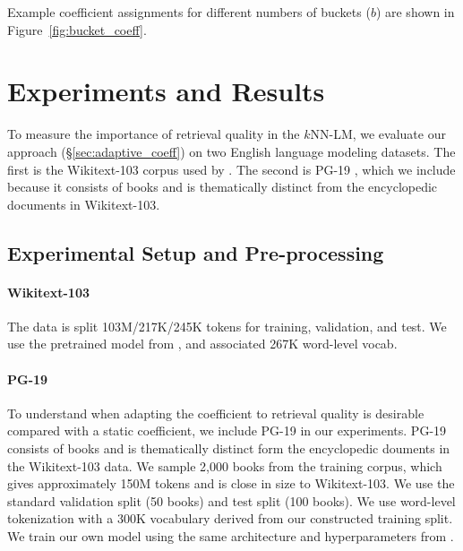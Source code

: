 \documentclass[11pt]{article}
\begin{document}
Example coefficient assignments for different numbers of buckets ($b$) are shown in Figure~\ref{fig:bucket_coeff}.

\section{Experiments and Results}

To measure the importance of retrieval quality in the $k$NN-LM, we evaluate our approach (\S\ref{sec:adaptive_coeff}) on two English language modeling datasets. The first is the Wikitext-103 corpus \cite{merity2016pointer} used by \citet{khandelwal20generalization}. The second is PG-19 \cite{rae2020compressive}, which we include because it consists of books and is thematically distinct from the encyclopedic documents in Wikitext-103.

\subsection{Experimental Setup and Pre-processing}

\paragraph{Wikitext-103} The data is split 103M/217K/245K tokens for training, validation, and test. We use the pretrained model from \citet{khandelwal20generalization}, and associated 267K word-level vocab.

\paragraph{PG-19} To understand when adapting the coefficient to retrieval quality is desirable compared with a static coefficient, we include PG-19 in our experiments. PG-19 consists of books and is thematically distinct form the encyclopedic douments in the Wikitext-103 data. We sample 2,000 books from the training corpus, which gives approximately 150M tokens and is close in size to Wikitext-103. We use the standard validation split (50 books) and test split (100 books). We use word-level tokenization with a 300K vocabulary derived from our constructed training split. We train our own model using the same architecture and hyperparameters from \citet{khandelwal20generalization}.
\end{document}
